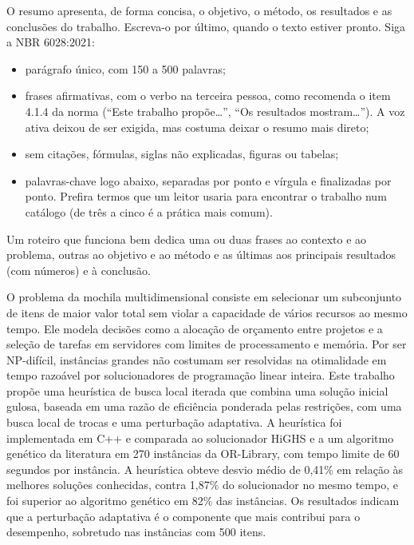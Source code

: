 \begin{resumo}
\begin{instrucao}
O resumo apresenta, de forma concisa, o objetivo, o método, os resultados e as
conclusões do trabalho. Escreva-o por último, quando o texto estiver pronto.
Siga a NBR 6028:2021:
\begin{itemize}
  \item parágrafo único, com 150 a 500 palavras;
  \item frases afirmativas, com o verbo na terceira pessoa, como recomenda o
        item 4.1.4 da norma (``Este trabalho propõe\ldots'', ``Os resultados
        mostram\ldots''). A voz ativa deixou de ser exigida, mas costuma
        deixar o resumo mais direto;
  \item sem citações, fórmulas, siglas não explicadas, figuras ou tabelas;
  \item palavras-chave logo abaixo, separadas por ponto e vírgula e finalizadas
        por ponto. Prefira termos que um leitor usaria para encontrar o
        trabalho num catálogo (de três a cinco é a prática mais comum).
\end{itemize}
Um roteiro que funciona bem dedica uma ou duas frases ao contexto e ao
problema, outras ao objetivo e ao método e as últimas aos principais
resultados (com números) e à conclusão.
\end{instrucao}

O problema da mochila multidimensional consiste em selecionar um subconjunto de
itens de maior valor total sem violar a capacidade de vários recursos ao mesmo
tempo. Ele modela decisões como a alocação de orçamento entre projetos e a
seleção de tarefas em servidores com limites de processamento e memória. Por
ser NP-difícil, instâncias grandes não costumam ser resolvidas na otimalidade
em tempo razoável por solucionadores de programação linear inteira. Este
trabalho propõe uma heurística de busca local iterada que combina uma solução
inicial gulosa, baseada em uma razão de eficiência ponderada pelas restrições,
com uma busca local de trocas e uma perturbação adaptativa. A heurística foi
implementada em C++ e comparada ao solucionador HiGHS e a um algoritmo
genético da literatura em 270 instâncias da OR-Library, com tempo limite de 60
segundos por instância. A heurística obteve desvio médio de 0,41\% em relação
às melhores soluções conhecidas, contra 1,87\% do solucionador no mesmo tempo, e
foi superior ao algoritmo genético em 82\% das instâncias. Os resultados
indicam que a perturbação adaptativa é o componente que mais contribui para o
desempenho, sobretudo nas instâncias com 500 itens.

\end{resumo}
